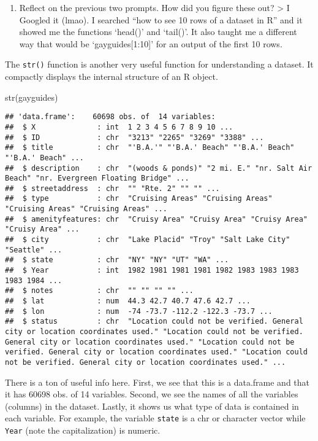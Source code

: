 \documentclass[
]{article}
\newenvironment{Shaded}{\begin{snugshade}}{\end{snugshade}}
\newcommand{\FunctionTok}[1]{\textcolor[rgb]{0.00,0.00,0.00}{#1}}
\newcommand{\NormalTok}[1]{#1}
\providecommand{\tightlist}{%
  \setlength{\itemsep}{0pt}\setlength{\parskip}{0pt}}
\begin{document}
\begin{enumerate}
\def\labelenumi{(\arabic{enumi})}
\setcounter{enumi}{21}
\tightlist
\item
  Reflect on the previous two prompts. How did you figure these out?
  \textgreater{} I Googled it (lmao). I searched ``how to see 10 rows of
  a dataset in R'' and it showed me the functions `head()' and `tail()'.
  It also taught me a different way that would be `gayguides{[}1:10{]}'
  for an output of the first 10 rows.
\end{enumerate}

The \texttt{str()} function is another very useful function for
understanding a dataset. It compactly displays the internal structure of
an R object.

\begin{Shaded}
\begin{Highlighting}[]
\FunctionTok{str}\NormalTok{(gayguides)}
\end{Highlighting}
\end{Shaded}

\begin{verbatim}
## 'data.frame':    60698 obs. of  14 variables:
##  $ X              : int  1 2 3 4 5 6 7 8 9 10 ...
##  $ ID             : chr  "3213" "2265" "3269" "3388" ...
##  $ title          : chr  "'B.A.'" "'B.A.' Beach" "'B.A.' Beach" "'B.A.' Beach" ...
##  $ description    : chr  "(woods & ponds)" "2 mi. E." "nr. Salt Air Beach" "nr. Evergreen Floating Bridge" ...
##  $ streetaddress  : chr  "" "Rte. 2" "" "" ...
##  $ type           : chr  "Cruising Areas" "Cruising Areas" "Cruising Areas" "Cruising Areas" ...
##  $ amenityfeatures: chr  "Cruisy Area" "Cruisy Area" "Cruisy Area" "Cruisy Area" ...
##  $ city           : chr  "Lake Placid" "Troy" "Salt Lake City" "Seattle" ...
##  $ state          : chr  "NY" "NY" "UT" "WA" ...
##  $ Year           : int  1982 1981 1981 1981 1982 1983 1983 1983 1983 1984 ...
##  $ notes          : chr  "" "" "" "" ...
##  $ lat            : num  44.3 42.7 40.7 47.6 42.7 ...
##  $ lon            : num  -74 -73.7 -112.2 -122.3 -73.7 ...
##  $ status         : chr  "Location could not be verified. General city or location coordinates used." "Location could not be verified. General city or location coordinates used." "Location could not be verified. General city or location coordinates used." "Location could not be verified. General city or location coordinates used." ...
\end{verbatim}

There is a ton of useful info here. First, we see that this is a
data.frame and that it has 60698 obs. of 14 variables. Second, we see
the names of all the variables (columns) in the dataset. Lastly, it
shows us what type of data is contained in each variable. For example,
the variable \texttt{state} is a chr or character vector while
\texttt{Year} (note the capitalization) is numeric.
\end{document}
